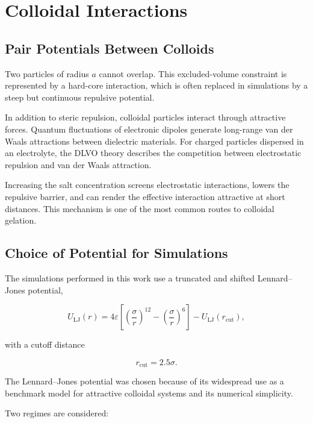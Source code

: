 \documentclass[11pt,a4paper]{article}
\begin{document}
\section{Colloidal Interactions}

\subsection{Pair Potentials Between Colloids}

Two particles of radius $a$ cannot overlap. This excluded-volume constraint is represented by a hard-core interaction, which is often replaced in simulations by a steep but continuous repulsive potential.

In addition to steric repulsion, colloidal particles interact through attractive forces. Quantum fluctuations of electronic dipoles generate long-range van der Waals attractions between dielectric materials. For charged particles dispersed in an electrolyte, the DLVO theory describes the competition between electrostatic repulsion and van der Waals attraction.

Increasing the salt concentration screens electrostatic interactions, lowers the repulsive barrier, and can render the effective interaction attractive at short distances. This mechanism is one of the most common routes to colloidal gelation.

\subsection{Choice of Potential for Simulations}

The simulations performed in this work use a truncated and shifted Lennard--Jones potential,

\begin{equation}
U_{\mathrm{LJ}}(r)
=
4\varepsilon
\left[
\left(\frac{\sigma}{r}\right)^{12}
-
\left(\frac{\sigma}{r}\right)^6
\right]
-
U_{\mathrm{LJ}}(r_{\mathrm{cut}}),
\label{eq:lj}
\end{equation}

with a cutoff distance

\begin{equation}
r_{\mathrm{cut}} = 2.5\sigma.
\end{equation}

The Lennard--Jones potential was chosen because of its widespread use as a benchmark model for attractive colloidal systems and its numerical simplicity.

Two regimes are considered:
\end{document}
